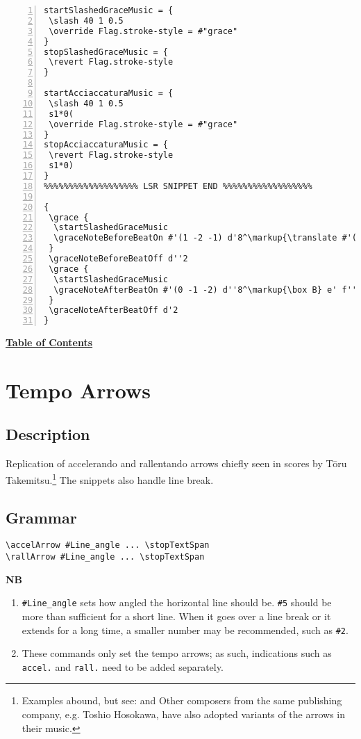 \begin{Verbatim}[numbers=left,xleftmargin=5mm]
startSlashedGraceMusic = {
 \slash 40 1 0.5
 \override Flag.stroke-style = #"grace"
}
stopSlashedGraceMusic = {
 \revert Flag.stroke-style
}

startAcciaccaturaMusic = {
 \slash 40 1 0.5
 s1*0(
 \override Flag.stroke-style = #"grace"
}
stopAcciaccaturaMusic = {
 \revert Flag.stroke-style
 s1*0)
}
%%%%%%%%%%%%%%%%%%% LSR SNIPPET END %%%%%%%%%%%%%%%%%%

{
 \grace {
  \startSlashedGraceMusic
  \graceNoteBeforeBeatOn #'(1 -2 -1) d'8^\markup{\translate #'(0 . 3) \box A} e f g e' c'
 }
 \graceNoteBeforeBeatOff d''2
 \grace {
  \startSlashedGraceMusic
  \graceNoteAfterBeatOn #'(0 -1 -2) d''8^\markup{\box B} e' f'' g' e'' c'
 }
 \graceNoteAfterBeatOff d'2
}
\end{Verbatim}

\hyperref[sec:toc]{\textbf{Table of Contents}}

\vfill \break



\section {Tempo Arrows}
\hfill
{}
\hfill

\subsection{Description}

Replication of accelerando and rallentando arrows chiefly seen in scores by Tōru Takemitsu.\footnote{Examples abound, but see: \cite{RN1736} and \cite{RN1735} Other composers from the same publishing company, e.g. Toshio Hosokawa, have also adopted variants of the arrows in their music.} The snippets also handle line break.

\subsection{Grammar}
\begin{verbatim}
\accelArrow #Line_angle ... \stopTextSpan
\rallArrow #Line_angle ... \stopTextSpan
\end{verbatim}


\textbf{NB} 
\begin{enumerate}
\item \verb|#Line_angle| sets how angled the horizontal line should be. \verb|#5| should be more than sufficient for a short line.  When it goes over a line break or it extends for a long time, a smaller number may be recommended, such as \verb|#2|. 
\item These commands only set the tempo arrows; as such, indications such as \verb|accel.| and \verb|rall.| need to be added separately. 
\end{enumerate}

